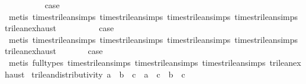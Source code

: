 \begin{isabellebody}
\isamarkupfalse%
\isanewline
\ \ \isamarkupfalse%
\ {\isachardoublequoteopen}{}{\isacharunderscore}{}{\isachardoublequoteclose}\isanewline
\ \ \isamarkupfalse%
\ \isamarkupfalse%
\ {\isacharquery}case\isanewline
\ \ \ \ \isamarkupfalse%
\ {\isacharparenleft}metis\ times{\isacharunderscore}trilean{\isachardot}simps{\isacharparenleft}{}{\isacharparenright}\ times{\isacharunderscore}trilean{\isachardot}simps{\isacharparenleft}{}{\isacharparenright}\ times{\isacharunderscore}trilean{\isachardot}simps{\isacharparenleft}{}{\isacharparenright}\ times{\isacharunderscore}trilean{\isachardot}simps{\isacharparenleft}{}{\isacharparenright}\ trilean{\isachardot}exhaust{\isacharparenright}\isanewline
{}\isamarkupfalse%
\isanewline
\ \ \isamarkupfalse%
\ {}\isanewline
\ \ \isamarkupfalse%
\ \isamarkupfalse%
\ {\isacharquery}case\isanewline
\ \ \ \ \isamarkupfalse%
\ {\isacharparenleft}metis\ times{\isacharunderscore}trilean{\isachardot}simps{\isacharparenleft}{}{\isacharparenright}\ times{\isacharunderscore}trilean{\isachardot}simps{\isacharparenleft}{}{\isacharparenright}\ times{\isacharunderscore}trilean{\isachardot}simps{\isacharparenleft}{}{\isacharparenright}\ times{\isacharunderscore}trilean{\isachardot}simps{\isacharparenleft}{}{\isacharparenright}\ trilean{\isachardot}exhaust{\isacharparenright}\isanewline
{}\isamarkupfalse%
\isanewline
{}\isamarkupfalse%
\ {}\isanewline
\ \ \isamarkupfalse%
\ \isamarkupfalse%
\ {\isacharquery}case\isanewline
\ \ \ \ \isamarkupfalse%
\ {\isacharparenleft}metis\ {\isacharparenleft}full{\isacharunderscore}types{\isacharparenright}\ times{\isacharunderscore}trilean{\isachardot}simps{\isacharparenleft}{}{\isacharparenright}\ times{\isacharunderscore}trilean{\isachardot}simps{\isacharparenleft}{}{\isacharparenright}\ times{\isacharunderscore}trilean{\isachardot}simps{\isacharparenleft}{}{\isacharparenright}\ trilean{\isachardot}exhaust{\isacharparenright}\isanewline
{}\isamarkupfalse%
%
\endisatagproof
{\isafoldproof}%
%
\isadelimproof
\isanewline
%
\endisadelimproof
\isanewline
{}\isamarkupfalse%
\ trilean{\isacharunderscore}distributivity{\isacharunderscore}{}{\isacharcolon}\ {\isachardoublequoteopen}{\isacharparenleft}a\ {\isasymor}\isactrlsub {\isacharquery}\ b{\isacharparenright}\ {\isasymand}\isactrlsub {\isacharquery}\ c\ {\isacharequal}\ a\ {\isasymand}\isactrlsub {\isacharquery}\ c\ {\isasymor}\isactrlsub {\isacharquery}\ b\ {\isasymand}\isactrlsub {\isacharquery}\ c{\isachardoublequoteclose}\isanewline

\end{isabellebody}
